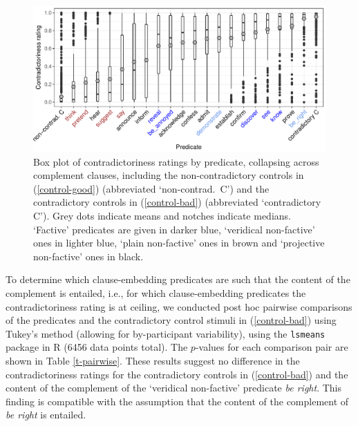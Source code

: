 \documentclass[11pt,fleqn]{article}
\newcommand{\6}{\mbox{$[\hspace*{-.6mm}[$}}
\newcommand{\9}{\mbox{$]\hspace*{-.6mm}]$}}
\begin{document}
{%

\begin{figure}[h!]
\centering

\includegraphics[width=.75\paperwidth]{../results/2-veridicality2/graphs/boxplot-veridicality}

\caption{Box plot of contradictoriness ratings by predicate, collapsing across complement clauses, including the non-contradictory controls in (\ref{control-good}) (abbreviated `non-contrad.\ C') and the contradictory controls in (\ref{control-bad}) (abbreviated `contradictory C'). Grey dots indicate means and notches indicate medians. `Factive' predicates are given in darker blue, `veridical non-factive' ones in lighter blue, `plain non-factive' ones in brown and `projective non-factive' ones in black.}
\label{f-veridicality-predicate}
\end{figure}

To determine which clause-embedding predicates are such that the content of the complement is entailed, i.e., for which clause-embedding predicates the contradictoriness rating is  at ceiling, we conducted post hoc pairwise comparisons of the predicates and the contradictory control stimuli in (\ref{control-bad}) using Tukey's method (allowing for by-participant variability), using the \verb|lsmeans| package \citep{tukey} in R \citep{r}  (6456 data points total). The $p$-values for each comparison pair are shown in Table  \ref{t-pairwise}. These results suggest no difference in the contradictoriness ratings for the contradictory controls in (\ref{control-bad}) and the content of the complement of the `veridical non-factive' predicate {\em be right}. This finding is compatible with the assumption that the content of the complement of {\em be right} is entailed.


}
\end{document}

